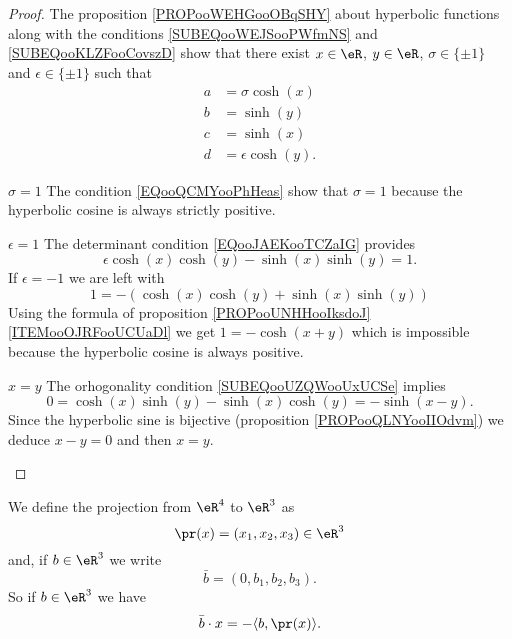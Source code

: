 \begin{proof}
    The proposition \ref{PROPooWEHGooOBqSHY} about hyperbolic functions along with the conditions \eqref{SUBEQooWEJSooPWfmNS} and \ref{SUBEQooKLZFooCovszD} show that there exist \( x\in \eR\), \( y\in \eR\), \( \sigma\in\{ \pm1 \}\) and \( \epsilon\in\{ \pm 1 \}\) such that 
    \begin{subequations}
        \begin{align}
            a&=\sigma\cosh(x)\\
            b&=\sinh(y)\\
            c&=\sinh(x)\\
            d&=\epsilon\cosh(y).
        \end{align}
    \end{subequations}

    \begin{subproof}
        \item[\( \sigma=1\)]
    The condition \eqref{EQooQCMYooPhHeas} show that \( \sigma=1\) because the hyperbolic cosine is always strictly positive.

        \item[\( \epsilon=1\)]
            The determinant condition \eqref{EQooJAEKooTCZaIG} provides
            \begin{equation}
                \epsilon\cosh(x)\cosh(y)-\sinh(x)\sinh(y)=1.
            \end{equation}
            If \( \epsilon=-1\) we are left with
            \begin{equation}
                1=-(\cosh(x)\cosh(y)+\sinh(x)\sinh(y))
            \end{equation}
            Using the formula of proposition \ref{PROPooUNHHooIksdoJ}\ref{ITEMooOJRFooUCUaDl} we get $1=-\cosh(x+y)$ which is impossible because the hyperbolic cosine is always positive.
        \item[\( x=y\)]
            The orhogonality condition \eqref{SUBEQooUZQWooUxUCSe} implies
            \begin{equation}
                0=\cosh(x)\sinh(y)-\sinh(x)\cosh(y)=-\sinh(x-y).
            \end{equation}
            Since the hyperbolic sine is bijective (proposition \ref{PROPooQLNYooIIOdvm}) we deduce \( x-y=0\) and then \( x=y\).
    \end{subproof}
\end{proof}

We define the projection from \( \eR^4\) to \( \eR^3\) as
\begin{equation}
    \pr(x)=(x_1,x_2,x_3)\in \eR^3
\end{equation}
and, if \( b\in \eR^3\) we write
\begin{equation}
    \bar b=(0,b_1,b_2,b_3).
\end{equation}
So if \( b\in \eR^3\) we have
\begin{equation}        \label{EQooOIBWooAvxfYz}
    \bar b\cdot x=-\langle b, \pr(x)\rangle .
\end{equation}

